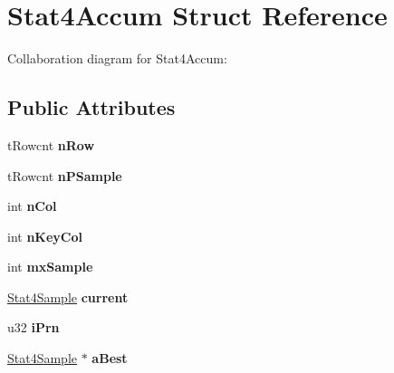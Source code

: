 \hypertarget{structStat4Accum}{}\section{Stat4\+Accum Struct Reference}
\label{structStat4Accum}


Collaboration diagram for Stat4\+Accum\+:
\subsection*{Public Attributes}
\begin{DoxyCompactItemize}
\item 
t\+Rowcnt {\bfseries n\+Row}\hypertarget{structStat4Accum_a7f06c1f2e4790e21b25aa68e5340f0b3}{}\label{structStat4Accum_a7f06c1f2e4790e21b25aa68e5340f0b3}

\item 
t\+Rowcnt {\bfseries n\+P\+Sample}\hypertarget{structStat4Accum_ac86c036108462008795ebfb7994ff674}{}\label{structStat4Accum_ac86c036108462008795ebfb7994ff674}

\item 
int {\bfseries n\+Col}\hypertarget{structStat4Accum_a4b5d9944be8bd28e2dcaaa10d23702db}{}\label{structStat4Accum_a4b5d9944be8bd28e2dcaaa10d23702db}

\item 
int {\bfseries n\+Key\+Col}\hypertarget{structStat4Accum_a018b3aa526f4d376e55042e290c935c4}{}\label{structStat4Accum_a018b3aa526f4d376e55042e290c935c4}

\item 
int {\bfseries mx\+Sample}\hypertarget{structStat4Accum_a2133206dd5209b1b0fce485bc6d48043}{}\label{structStat4Accum_a2133206dd5209b1b0fce485bc6d48043}

\item 
\hyperlink{structStat4Sample}{Stat4\+Sample} {\bfseries current}\hypertarget{structStat4Accum_a9e65f562b6944448edde933a6d29fdf2}{}\label{structStat4Accum_a9e65f562b6944448edde933a6d29fdf2}

\item 
u32 {\bfseries i\+Prn}\hypertarget{structStat4Accum_a13746aceec404f569af80ee44c9315ac}{}\label{structStat4Accum_a13746aceec404f569af80ee44c9315ac}

\item 
\hyperlink{structStat4Sample}{Stat4\+Sample} $\ast$ {\bfseries a\+Best}\hypertarget{structStat4Accum_a634729ee0061b7243e770b6281d9a7a4}{}\label{structStat4Accum_a634729ee0061b7243e770b6281d9a7a4}


\end{DoxyCompactItemize}
